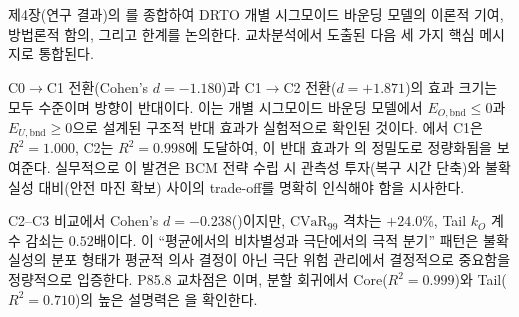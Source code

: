 

\section{}
\label{sec:ch5_discussion}

제4장(연구 결과)의 를 종합하여 DRTO 개별 시그모이드
바운딩 모델의 이론적 기여, 방법론적 함의, 그리고 한계를 논의한다.
교차분석에서 도출된  다음 세 가지 핵심 메시지로 통합된다.
\label{subsec:ch5_integration}


C0$\to$C1 전환(Cohen's $d = -1.180$)과 C1$\to$C2 전환($d = +1.871$)의
효과 크기는 모두  수준이며 방향이 반대이다.
이는 개별 시그모이드 바운딩 모델에서 $E_{O,\text{bnd}} \leq 0$과
$E_{U,\text{bnd}} \geq 0$으로 설계된 구조적 반대 효과가
실험적으로 확인된 것이다.
에서 C1은 $R^2 = 1.000$, C2는 $R^2 = 0.998$에 도달하여,
이 반대 효과가 의 정밀도로 정량화됨을 보여준다.
실무적으로 이 발견은 BCM 전략 수립 시 관측성 투자(복구 시간 단축)와
불확실성 대비(안전 마진 확보) 사이의 trade-off를 명확히 인식해야
함을 시사한다.

C2--C3 비교에서 Cohen's $d = -0.238$()이지만,
$\mathrm{CVaR}_{99}$ 격차는 $+24.0\%$, Tail $k_O$ 계수 감쇠는 $0.52$배이다.
이 ``평균에서의 비차별성과 극단에서의 극적 분기'' 패턴은
불확실성의 분포 형태가 평균적 의사 결정이 아닌 극단 위험 관리에서
결정적으로 중요함을 정량적으로 입증한다.
P85.8 교차점은 이며,
분할 회귀에서 Core($R^2 = 0.999$)와 Tail($R^2 = 0.710$)의
높은 설명력은 을 확인한다.

